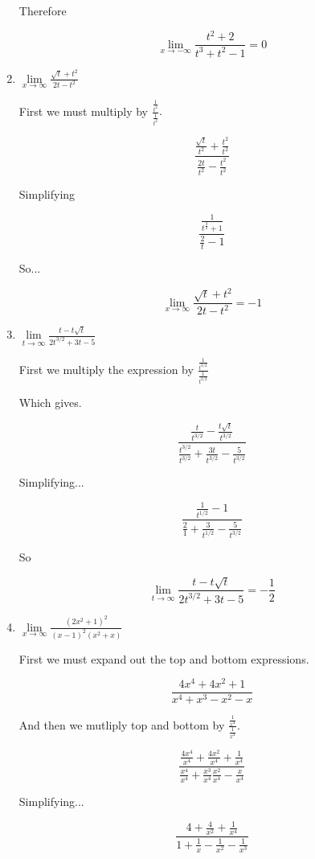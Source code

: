 \documentclass{article}
\begin{document}
\begin{enumerate}
			Therefore

			$$\lim \limits _{x \to -\infty} \frac{t^2 + 2}{t^3 + t^2 - 1} = 0$$

		\item $\lim \limits _{x \to \infty} \frac{\sqrt{t} + t^2}{2t - t^2}$

			First we must multiply by $ \frac{ \frac{1}{t^2}}{\frac{1}{t^2}}.$

			$$\frac{ \frac{\sqrt{t}}{t^2} + \frac{t^2}{t^2}}{\frac{2t}{t^2} - \frac{t^2}{t^2}}$$

			Simplifying

			$$\frac{ \frac{1}{t^{\frac{3}{2}} + 1}}{\frac{2}{t} - 1}$$

			So...

			$$\lim \limits _{x \to \infty} \frac{\sqrt{t} + t^2}{2t - t^2} = -1$$

		\item $\lim \limits _{t \to \infty} \frac{t - t\sqrt{t}}{2t^{3/2}+3t-5}$

			First we multiply the expression by $\frac{\frac{1}{t^{3/2}}}{\frac{1}{t^{3/2}}}$

			Which gives.

			$$\frac{\frac{t}{t^{3/2}} - \frac{t\sqrt{t}}{t^{3/2}}}{\frac{t^{3/2}}{t^{3/2}} + \frac{3t}{t^{3/2}} - \frac{5}{t^{3/2}}}$$

			Simplifying...

			$$\frac{ \frac{1}{t^{1/2}} - 1}{ \frac{2}{1} + \frac{3}{t^{1/2}} - \frac{5}{t^{3/2}}}$$

			So

			$$\lim \limits _{t \to \infty} \frac{t - t\sqrt{t}}{2t^{3/2} + 3t - 5} = -\frac{1}{2}$$

		\item $\lim \limits _{x \to \infty} \frac{(2x^2 + 1)^2}{(x-1)^2(x^2+x)}$

			First we must expand out the top and bottom expressions.

			$$\frac{4x^4 + 4x^2 + 1}{x^4 + x^3 - x^2 - x}$$

			And then we mutliply top and bottom by $\frac{ \frac{1}{x^4}}{\frac{1}{x^4}}$.

			$$\frac{ \frac{4x^4}{x^4} + \frac{4x^2}{x^4} + \frac{1}{x^4}}{ \frac{x^4}{x^4} + \frac{x^3}{x^4} \frac{x^2}{x^4} - \frac{x}{x^4}}$$

			Simplifying...

			$$\frac{ 4 + \frac{4}{x^2} + \frac{1}{x^4}}{1 + \frac{1}{x} - \frac{1}{x^2} - \frac{1}{x^3}}$$


\end{enumerate}
\end{document}
